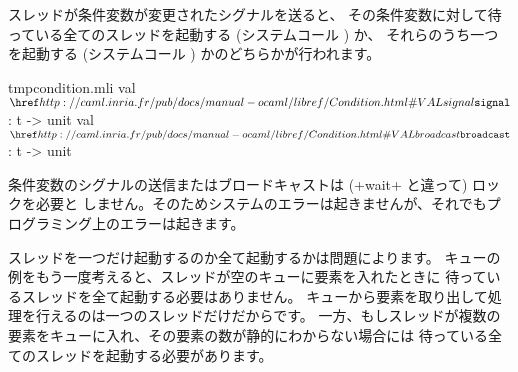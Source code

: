 スレッドが条件変数が変更されたシグナルを送ると、
その条件変数に対して待っている全てのスレッドを起動する (システムコール ) か、
それらのうち一つを起動する (システムコール ) かのどちらかが行われます。
%
\begin{listingcodefile}{tmpcondition.mli}
val $\libvalue{Condition}{signal}$ : t -> unit
val $\libvalue{Condition}{broadcast}$ : t -> unit
\end{listingcodefile}
%
条件変数のシグナルの送信またはブロードキャストは (\ml+wait+ と違って) ロックを必要と
しません。そのためシステムのエラーは起きませんが、それでもプログラミング上のエラーは起きます。

スレッドを一つだけ起動するのか全て起動するかは問題によります。
キューの例をもう一度考えると、スレッドが空のキューに要素を入れたときに
待っているスレッドを全て起動する必要はありません。
キューから要素を取り出して処理を行えるのは一つのスレッドだけだからです。
一方、もしスレッドが複数の要素をキューに入れ、その要素の数が静的にわからない場合には
待っている全てのスレッドを起動する必要があります。

